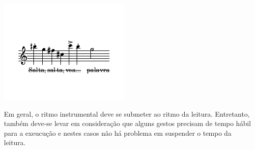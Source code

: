 \documentclass[a4paper]{article}
\begin{document}
\begin{center}
\includegraphics[width=.9\linewidth]{exemplo_tempo_fala.pdf}
\end{center}

Em geral, o ritmo instrumental deve se submeter ao ritmo da leitura. Entretanto, também deve-se levar em consideração que alguns gestos precisam de tempo hábil para a exeucução e nestes casos não há problema em suspender o tempo da leitura.




\end{document}
